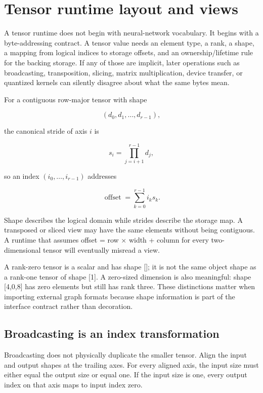 \hypertarget{appendix-cebadf3106d1}{}\label{referencestart:appendix-cebadf3106d1}
\section{Tensor runtime layout and views}\label{appendix-cebadf3106d1-tensor-runtime-layout-and-views}

A tensor runtime does not begin with neural-network vocabulary. It begins with a byte-addressing contract. A tensor value needs an element type, a rank, a shape, a mapping from logical indices to storage offsets, and an ownership/lifetime rule for the backing storage. If any of those are implicit, later operations such as broadcasting, transposition, slicing, matrix multiplication, device transfer, or quantized kernels can silently disagree about what the same bytes mean.

For a contiguous row-major tensor with shape

\[
(d_0,d_1,\ldots,d_{r-1}),
\]

the canonical stride of axis \(i\) is

\[
s_i = \prod_{j=i+1}^{r-1} d_j,
\]

so an index \((i_0,\ldots,i_{r-1})\) addresses

\[
\operatorname{offset}=\sum_{k=0}^{r-1} i_k s_k.
\]

Shape describes the logical domain while strides describe the storage map. A transposed or sliced view may have the same elements without being contiguous. A runtime that assumes offset = row × width + column for every two-dimensional tensor will eventually misread a view.

A rank-zero tensor is a scalar and has shape {[}{]}; it is not the same object shape as a rank-one tensor of shape {[}1{]}. A zero-sized dimension is also meaningful: shape {[}4,0,8{]} has zero elements but still has rank three. These distinctions matter when importing external graph formats because shape information is part of the interface contract rather than decoration.

\subsection{Broadcasting is an index transformation}\label{appendix-cebadf3106d1-broadcasting-is-an-index-transformation}

Broadcasting does not physically duplicate the smaller tensor. Align the input and output shapes at the trailing axes. For every aligned axis, the input size must either equal the output size or equal one. If the input size is one, every output index on that axis maps to input index zero.

